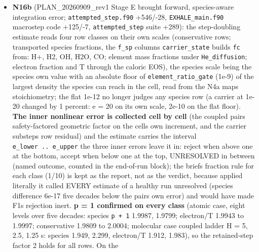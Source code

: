 \documentclass[english,a4paper]{my_memo}
\begin{document}
\begin{itemize}
  evaluation restores \texttt{n\_eq\_sweeps\_last}, so a caller reads the previous
  state\textquotesingle s pass count; \texttt{report\_accepted\_cell\_state} writes inside the
  parallel region without a lock; \texttt{carrier\_diffusion\_coefficient} reads the
  marching operator\textquotesingle s \texttt{pct\_Dco}, which the stationary residual never fills
  (a pure stationary path would read zero; \texttt{diffusive\_photochemistry.f90});
  the global \texttt{count} shadows the intrinsic.
\item
  \textbf{N16b} (PLAN\_20260909\_rev1 Stage E brought forward, species-aware
  integration error; \texttt{attempted\_step.f90} +546/-28, \texttt{EXHALE\_main.f90}
  macrostep code +125/-7, \texttt{attempted\_step} suite +289): the step-doubling
  estimate reads four row classes on their own scales (conservative rows;
  transported species fractions, the \texttt{f\_sp} columns \texttt{carrier\_state} builds
  \texttt{fc} from: H+, H2, OH, H2O, CO; element mass fractions under
  \texttt{He\_diffusion}; electron fraction and T through the caloric EOS), the
  species scale being the species\textquotesingle{} own value with an absolute floor of
  \texttt{element\_ratio\_gate} (1e-9) of the largest density the species can reach
  in the cell, read from the N4a map\textquotesingle s stoichiometry; the flat 1e-12 no
  longer judges any species row (a carrier at 1e-20 changed by 1 percent:
  e = 20 on its own scale, 2e-10 on the flat floor). \textbf{The inner nonlinear
  error is collected cell by cell} (the coupled pair\textquotesingle s safety-factored
  geometric factor on the cell\textquotesingle s own increment, and the carrier substep\textquotesingle s
  row residual) and the estimate carries the interval \texttt{e\_lower\ ..\ e\_upper}
  the three inner errors leave it in: reject when above one at the bottom,
  accept when below one at the top, UNRESOLVED in between (named outcome,
  counted in the end-of-run block); the brief\textquotesingle s fraction rule for each class
  (1/10) is kept as the report, not as the verdict, because applied
  literally it called EVERY estimate of a healthy run unresolved (species
  difference 6e-17 five decades below the pair\textquotesingle s own error) and would have
  made F1\textquotesingle s rejection inert. \textbf{p = 1 confirmed on every class} (atomic
  case, eight levels over five decades: species \texttt{p\ +\ 1} 1.9987, 1.9799;
  electron/T 1.9943 to 1.9997; conservative 1.9809 to 2.0004; molecular
  case coupled ladder H = 5, 2.5, 1.25 s: species 1.949, 2.299, electron/T
  1.912, 1.983), so the retained-step factor 2 holds for all rows. On the

\end{itemize}
\end{document}
